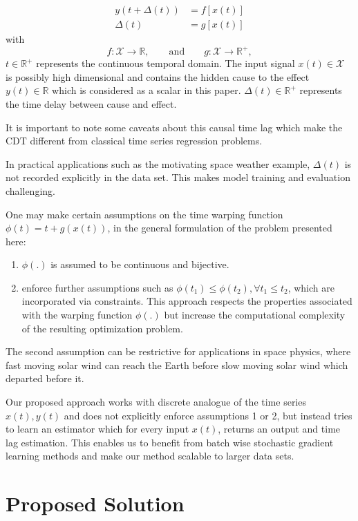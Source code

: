 \documentclass[twoside]{article}
\begin{document}
\begin{align}
y(t + \Delta(t)) & = f[x(t)]\label{eq:pb1}\\
\Delta(t) & = g[x(t)]\label{eq:pb2} 
\end{align}
with
\[
f: \mathcal{X}  \rightarrow \mathbb{R},\qquad\text{and}\qquad
g: \mathcal{X}  \rightarrow \mathbb{R}^{+},
\]
$t \in \mathbb{R}^{+}$ represents the continuous temporal domain. The input signal $x(t)\in \mathcal{X}$ is possibly high dimensional and contains the hidden cause to the effect $y(t)\in\mathbb{R}$ which is considered as a scalar in this paper. $\Delta(t)\in \mathbb{R}^+$ represents the time delay between cause and effect.

It is important to note some caveats about this causal time lag which make the CDT different from classical time series regression problems.

In practical applications such as the motivating space weather example, $\Delta(t)$ is not recorded explicitly in the data set. This makes model training and evaluation challenging.

One may make certain assumptions on the time warping function $\phi(t) = t + g(x(t))$, in the general formulation of the problem presented here: 

\begin{enumerate}
    \item $\phi(.)$ is assumed to be continuous and bijective.
    \item \cite{ZHOU2006195} enforce further assumptions such as $\phi(t_1) \leq \phi(t_2), \forall t_1 \leq t_2$, which are incorporated via constraints. This approach respects the properties associated with the warping function $\phi(.)$ but increase the computational complexity of the resulting optimization problem.
\end{enumerate}

The second assumption can be restrictive for applications in space physics, where fast moving solar wind can reach the Earth before slow moving solar wind which departed before it. 

Our proposed approach works with discrete analogue of the time series $x(t), y(t)$ and does not explicitly enforce assumptions 1 or 2, but instead tries to learn an estimator which for every input $x(t)$, returns an output and time lag estimation. This enables us to benefit from batch wise stochastic gradient learning methods and make our method scalable to larger data sets.


\section{Proposed Solution}\label{sec:model}
\end{document}
